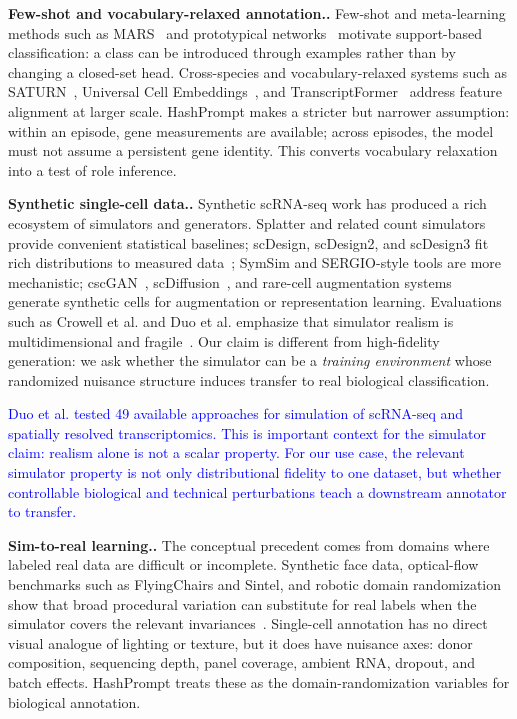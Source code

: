 \documentclass{article}
\newcommand{\myparagraph}[1]{\noindent\textbf{#1.} }
\newcommand{\phflo}[1]{\textcolor{blue}{#1}}
\begin{document}
\myparagraph{Few-shot and vocabulary-relaxed annotation.}
Few-shot and meta-learning methods such as MARS~\cite{brbic2020mars} and prototypical networks~\cite{snell2017prototypical} motivate support-based classification: a class can be introduced through examples rather than by changing a closed-set head. Cross-species and vocabulary-relaxed systems such as SATURN~\cite{saturn}, Universal Cell Embeddings~\cite{uce}, and TranscriptFormer~\cite{transcriptformer} address feature alignment at larger scale. HashPrompt makes a stricter but narrower assumption: within an episode, gene measurements are available; across episodes, the model must not assume a persistent gene identity. This converts vocabulary relaxation into a test of role inference.

\myparagraph{Synthetic single-cell data.}
Synthetic scRNA-seq work has produced a rich ecosystem of simulators and generators. Splatter and related count simulators provide convenient statistical baselines; scDesign, scDesign2, and scDesign3 fit rich distributions to measured data~\cite{scdesign,scdesign2,scdesign3}; SymSim and SERGIO-style tools are more mechanistic; cscGAN~\cite{marouf2020realistic}, scDiffusion~\cite{luo2024scdiffusion}, and rare-cell augmentation systems~\cite{bej2021automated,nouri2025single} generate synthetic cells for augmentation or representation learning. Evaluations such as Crowell et al. and Duo et al. emphasize that simulator realism is multidimensional and fragile~\cite{crowell2023shaky,duo2024systematic}. Our claim is different from high-fidelity generation: we ask whether the simulator can be a \emph{training environment} whose randomized nuisance structure induces transfer to real biological classification.

\phflo{Duo et al. tested 49 available approaches for simulation of scRNA-seq and spatially resolved transcriptomics. This is important context for the simulator claim: realism alone is not a scalar property. For our use case, the relevant simulator property is not only distributional fidelity to one dataset, but whether controllable biological and technical perturbations teach a downstream annotator to transfer.}

\myparagraph{Sim-to-real learning.}
The conceptual precedent comes from domains where labeled real data are difficult or incomplete. Synthetic face data, optical-flow benchmarks such as FlyingChairs and Sintel, and robotic domain randomization show that broad procedural variation can substitute for real labels when the simulator covers the relevant invariances~\cite{Mayer_2016_CVPR,ButlerWSB12,teed2020raft}. Single-cell annotation has no direct visual analogue of lighting or texture, but it does have nuisance axes: donor composition, sequencing depth, panel coverage, ambient RNA, dropout, and batch effects. HashPrompt treats these as the domain-randomization variables for biological annotation.
\end{document}
